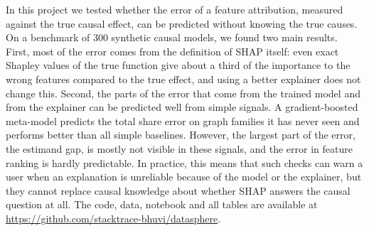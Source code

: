 In this project we tested whether the error of a feature attribution, measured against the true causal effect, can be predicted without knowing the true causes. On a benchmark of 300 synthetic causal models, we found two main results. First, most of the error comes from the definition of SHAP itself: even exact Shapley values of the true function give about a third of the importance to the wrong features compared to the true effect, and using a better explainer does not change this. Second, the parts of the error that come from the trained model and from the explainer can be predicted well from simple signals. A gradient-boosted meta-model predicts the total share error on graph families it has never seen and performs better than all simple baselines. However, the largest part of the error, the estimand gap, is mostly not visible in these signals, and the error in feature ranking is hardly predictable. In practice, this means that such checks can warn a user when an explanation is unreliable because of the model or the explainer, but they cannot replace causal knowledge about whether SHAP answers the causal question at all. The code, data, notebook and all tables are available at \url{https://github.com/stacktrace-bhuvi/datasphere}.
